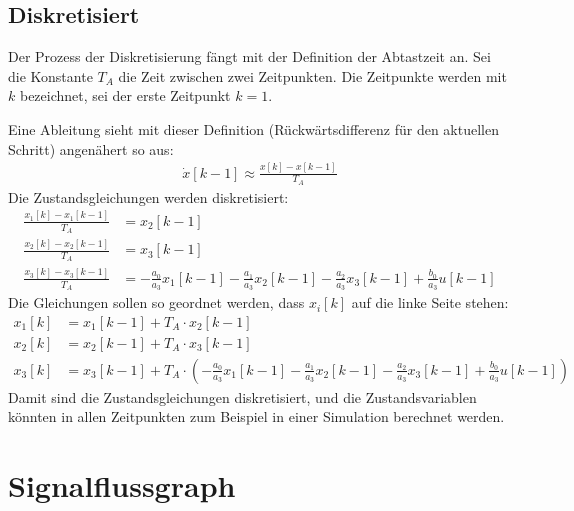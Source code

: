 \documentclass[fleqn,12pt]{article}
\begin{document}
\subsection{Diskretisiert}
Der Prozess der Diskretisierung fängt mit der Definition der Abtastzeit an. Sei die Konstante $T_A$ die Zeit zwischen zwei Zeitpunkten. Die Zeitpunkte werden mit $k$ bezeichnet, sei der erste Zeitpunkt $k=1$.

Eine Ableitung sieht mit dieser Definition (Rückwärtsdifferenz für den aktuellen Schritt) angenähert so aus:
\begin{align*}
  \dot{x}[k-1] \approx \frac{x[k] - x[k-1]}{T_A}
\end{align*}
Die Zustandsgleichungen werden diskretisiert:
\setcounter{equation}{0}
\begin{align}
  \frac{x_1[k] - x_1[k-1]}{T_A} &= x_2[k-1] \\
  \frac{x_2[k] - x_2[k-1]}{T_A} &= x_3[k-1] \\
  \frac{x_3[k] - x_3[k-1]}{T_A} &= -\frac{a_0}{a_3}x_1[k-1] -\frac{a_1}{a_3}x_2[k-1] -\frac{a_2}{a_3}x_3[k-1] + \frac{b_0}{a_3}u[k-1]
\end{align}
Die Gleichungen sollen so geordnet werden, dass $x_i[k]$ auf die linke Seite stehen:
\setcounter{equation}{0}
\begin{align}
  x_1[k] &= x_1[k-1] + T_A \cdot x_2[k-1] \\
  x_2[k] &= x_2[k-1] + T_A \cdot x_3[k-1] \\
  x_3[k] &= x_3[k-1] + T_A \cdot (-\frac{a_0}{a_3}x_1[k-1] -\frac{a_1}{a_3}x_2[k-1] -\frac{a_2}{a_3}x_3[k-1] + \frac{b_0}{a_3}u[k-1])
\end{align}
Damit sind die Zustandsgleichungen diskretisiert, und die Zustandsvariablen könnten in allen Zeitpunkten zum Beispiel in einer Simulation berechnet werden.

\section{Signalflussgraph}
\begin{figure} [H]
  \centering
\end{figure}
\end{document}
